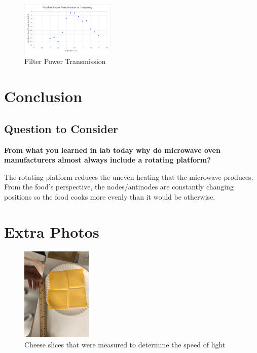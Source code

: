 \documentclass[journal]{IEEEtran}
\begin{document}
\begin{figure}[htbp]
    \centering
        \caption{Filter Power Transmission
        \label{fig:filter}
        }
    \includegraphics[width=0.4\textwidth]{filter_transmission.png}
\end{figure}


\section{Conclusion}
\subsection{Question to Consider}

\textbf{From what you learned in lab today why do microwave oven manufacturers
almost always include a rotating platform?}

The rotating platform reduces the uneven heating that the microwave produces.
From the food’s perspective, the nodes/antinodes are constantly changing
positions so the food cooks more evenly than it would be otherwise.    

\appendices

\section{Extra Photos}

\begin{figure}[htbp]
    \centering
    \caption{Cheese slices that were measured to determine the speed of light
        \label{fig:cheese}
    }
    \includegraphics[width=0.3\textwidth]{cheese.jpg}
\end{figure}
\end{document}
